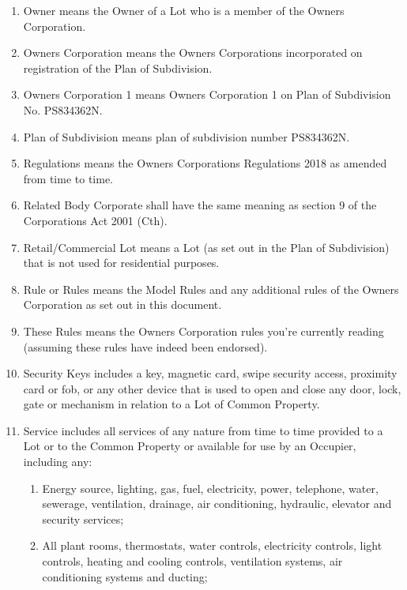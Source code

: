 \documentclass{article}
\begin{document}
\begin{enumerate}[label=\arabic*.]
\begin{enumerate}[label=\arabic{enumi}.\arabic*.]
\begin{enumerate}[label=\arabic{enumi}.\arabic*.]
\begin{enumerate}[label=(\arabic*)]
\item  Owner means the Owner of a Lot who is a member of the Owners Corporation.

\item  Owners Corporation means the Owners Corporations incorporated on registration of the Plan of Subdivision.

\item  Owners Corporation 1 means Owners Corporation 1 on Plan of Subdivision No. PS834362N.

\item  Plan of Subdivision means plan of subdivision number PS834362N.

\item  Regulations means the Owners Corporations Regulations 2018 as amended from time to time.

\item  Related Body Corporate shall have the same meaning as section 9 of the Corporations Act 2001 (Cth).

\item  Retail/Commercial Lot means a Lot (as set out in the Plan of Subdivision) that is not used for residential purposes.

\item  Rule or Rules means the Model Rules and any additional rules of the Owners Corporation as set out in this document.

\item These Rules means the Owners Corporation rules you're currently reading (assuming these rules have indeed been endorsed).
\item  Security Keys includes a key, magnetic card, swipe security access, proximity card or fob, or any other device that is used to open and close any door, lock, gate or mechanism in relation to a Lot of Common Property.

\item  Service includes all services of any nature from time to time provided to a Lot or to the Common Property or available for use by an Occupier, including any:

\begin{enumerate}[label=(\alph*)]

\item  Energy source, lighting, gas, fuel, electricity, power, telephone, water, sewerage, ventilation, drainage, air conditioning, hydraulic, elevator and security services;

\item  All plant rooms, thermostats, water controls, electricity controls, light controls, heating and cooling controls, ventilation systems, air conditioning systems and ducting;


\end{enumerate}
\end{enumerate}
\end{enumerate}
\end{enumerate}
\end{enumerate}
\end{document}
